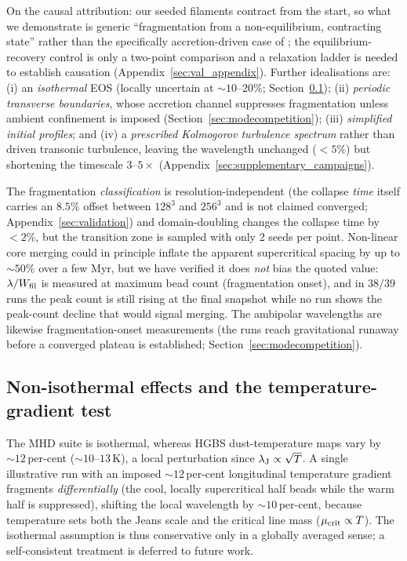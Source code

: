 \documentclass[usenatbib,twoside,twocolumn]{mnras}
\begin{document}
On the causal attribution: our seeded filaments contract from the start, so what we demonstrate is generic ``fragmentation from a non-equilibrium, contracting state'' rather than the specifically accretion-driven case of \citet{Clarke2016,Clarke2017}; the equilibrium-recovery control is only a two-point comparison and a relaxation ladder is needed to establish causation (Appendix~\ref{sec:val_appendix}). Further idealisations are: (i) an \emph{isothermal} EOS (locally uncertain at $\sim10$--$20\%$; Section~\ref{sec:mt_variation}); (ii) \emph{periodic transverse boundaries}, whose accretion channel suppresses fragmentation unless ambient confinement is imposed (Section~\ref{sec:modecompetition}); (iii) \emph{simplified initial profiles}; and (iv) a \emph{prescribed Kolmogorov turbulence spectrum} rather than driven transonic turbulence, leaving the wavelength unchanged ($<5\%$) but shortening the timescale $3$--$5\times$ (Appendix~\ref{sec:supplementary_campaigns}).

The fragmentation \emph{classification} is resolution-independent (the collapse \emph{time} itself carries an $8.5\%$ offset between $128^3$ and $256^3$ and is not claimed converged; Appendix~\ref{sec:validation}) and domain-doubling changes the collapse time by $<2\%$, but the transition zone is sampled with only 2 seeds per point. Non-linear core merging could in principle inflate the apparent supercritical spacing by up to $\sim50\%$ over a few Myr, but we have verified it does \emph{not} bias the quoted value: $\lambda/W_{\rm fil}$ is measured at maximum bead count (fragmentation onset), and in $38/39$ runs the peak count is still rising at the final snapshot while no run shows the peak-count decline that would signal merging. The ambipolar wavelengths are likewise fragmentation-onset measurements (the runs reach gravitational runaway before a converged plateau is established; Section~\ref{sec:modecompetition}).


\subsection{Non-isothermal effects and the temperature-gradient test}
\label{sec:mt_variation}

The MHD suite is isothermal, whereas HGBS dust-temperature maps vary by $\sim12$\,per-cent ($\sim10$--$13$\,K), a local perturbation since $\lambda_{\rm J}\propto\sqrt{T}$. A single illustrative run with an imposed $\sim12$\,per-cent longitudinal temperature gradient fragments \emph{differentially} (the cool, locally supercritical half beads while the warm half is suppressed), shifting the local wavelength by $\sim10$\,per-cent, because temperature sets both the Jeans scale and the critical line mass ($\mu_{\rm crit}\propto T$). The isothermal assumption is thus conservative only in a globally averaged sense; a self-consistent treatment is deferred to future work.
\end{document}
